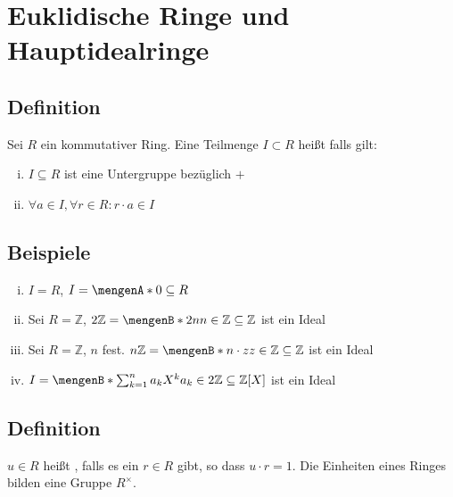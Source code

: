 \section{Euklidische Ringe und Hauptidealringe} %
\label{sec:9}
\subsection[Definiton Ideal]{Definition} %
\label{sub:91}
Sei $R$ ein kommutativer Ring. Eine Teilmenge $I \subset R$ heißt  falls gilt: 
\begin{enumerate}[i)]
	\item $I \subseteq R$ ist eine Untergruppe bezüglich $+$
	\item $\forall a \in I, \forall r \in R : r \cdot a \in I$
\end{enumerate}

\subsection[Beispiele für Ideale]{Beispiele} %
\label{sub:92}
\begin{enumerate}[i)]
	\item $I=R$, $I= \set{0} \subseteq R $
	\item Sei $R=\mathds{Z}$, $2 \mathds{Z} = \set[2 n]{n \in \mathds{Z}} \subseteq \mathds{Z} $ ist ein Ideal
	\item Sei $R=\mathds{Z}$, $n$ fest. $n \mathds{Z} = \set[n \cdot z]{z \in \mathds{Z}} \subseteq \mathds{Z} $ ist ein Ideal
	\item $I= \set[\sum_{k=1}^{n} a_k X^k]{a_k \in 2 \mathds{Z}} \subseteq \mathds{Z}[X] $ ist ein Ideal
\end{enumerate}

\subsection[Definition Einheit]{Definition} %
\label{sub:93}
$u \in R$ heißt , falls es ein $r \in R$ gibt, so dass $u \cdot r = 1$. Die Einheiten eines Ringes bilden eine Gruppe $R^\times$. 


